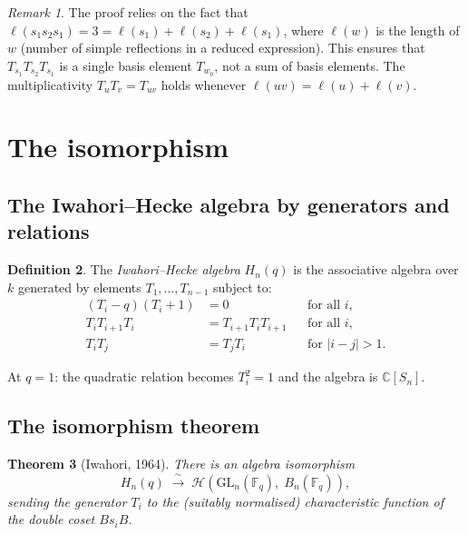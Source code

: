 \documentclass[12pt,a4paper]{article}
\newtheorem{theorem}{Theorem}[section]
\theoremstyle{definition}
\newtheorem{definition}[theorem]{Definition}
\theoremstyle{remark}
\newtheorem{remark}[theorem]{Remark}
\newcommand{\C}{\mathbb{C}}
\newcommand{\F}{\mathbb{F}}
\newcommand{\GL}{\mathrm{GL}}
\newcommand{\Hecke}{\mathcal{H}}
\begin{document}
\begin{remark}
The proof relies on the fact that $\ell(s_1 s_2 s_1) = 3 =
\ell(s_1) + \ell(s_2) + \ell(s_1)$, where $\ell(w)$ is the length
of $w$ (number of simple reflections in a reduced expression). This
ensures that $T_{s_1}T_{s_2}T_{s_1}$ is a single basis element
$T_{w_0}$, not a sum of basis elements. The multiplicativity
$T_u T_v = T_{uv}$ holds whenever $\ell(uv) = \ell(u) + \ell(v)$.
\end{remark}

\section{The isomorphism}
\label{sec:iso}

\subsection{The Iwahori--Hecke algebra by generators and relations}

\begin{definition}
The \emph{Iwahori--Hecke algebra} $H_n(q)$ is the associative algebra
over $k$ generated by elements $T_1, \ldots, T_{n-1}$ subject to:
\begin{align}
  (T_i - q)(T_i + 1) &= 0
  && \text{for all } i, \label{eq:IH-quad} \\
  T_i T_{i+1} T_i &= T_{i+1} T_i T_{i+1}
  && \text{for all } i, \label{eq:IH-braid} \\
  T_i T_j &= T_j T_i
  && \text{for } |i - j| > 1. \label{eq:IH-comm}
\end{align}
\end{definition}

At $q = 1$: the quadratic relation becomes $T_i^2 = 1$ and the
algebra is $\C[S_n]$.

\subsection{The isomorphism theorem}

\begin{theorem}[Iwahori, 1964]\label{thm:iwahori}
There is an algebra isomorphism
\[
  H_n(q) \;\xrightarrow{\;\sim\;}\;
  \Hecke(\GL_n(\F_q),\; B_n(\F_q)),
\]
sending the generator $T_i$ to the (suitably normalised) characteristic
function of the double coset $B s_i B$.
\end{theorem}
\end{document}
